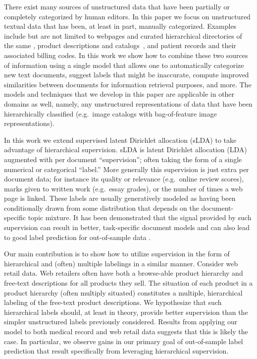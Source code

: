 There exist many sources of unstructured data that have been partially or
completely categorized by human editors.  In this paper we focus on
unstructured textual data that has been, at least in part, manually
categorized.  Examples include but are not limited to webpages and curated
hierarchical directories of the same \citep{DMOZ}, product descriptions and
catalogs~\citep{SNAP}, and patient records and their associated billing codes.
In this work we show how to combine these two sources of information using a
single model that allows one to automatically categorize new text documents,
suggest labels that might be inaccurate, compute improved similarities between
documents for information retrieval purposes, and more. The models and
techniques that we develop in this paper are applicable in other domains as
well, namely, any unstructured representations of data that have been
hierarchically classified (e.g.~image catalogs with bag-of-feature image
representations).   

In this work we extend supervised latent Dirichlet allocation (sLDA) \cite{BleiMcAuliffe2008} to take advantage of hierarchical supervision.  sLDA is latent Dirichlet allocation (LDA) \cite{Blei2003} augmented with per document ``supervision'';  often taking the form of a single numerical or categorical ``label.''  More generally this supervision is just extra per document data;  for instance its quality or relevance (e.g.~online review scores), marks given to written work (e.g.~essay grades), or the number of times a web page is linked.  These labels are usually generatively modeled as having been conditionally drawn from some distribution that depends on the document-specific topic mixture.  It has been demonstrated that the signal provided by such supervision can result in better, task-specific document models and can also lead to good label prediction for out-of-sample data \cite{BleiMcAuliffe2008}.

Our main contribution is to show how to utilize supervision in the form of  hierarchical and (often) multiple labelings in a similar manner.   Consider web retail data.  Web retailers often have both a browse-able product hierarchy and free-text descriptions for all products they sell.   The situation of each product in a product hierarchy (often multiply situated) constitutes a multiple, hierarchical labeling of the free-text product descriptions.  We hypothesize that such hierarchical labels should, at least in theory, provide better supervision than the simpler unstructured labels previously considered.  Results from applying our model to both medical record and web retail data suggests that this is likely the case.  In particular, we observe gains in our primary goal of out-of-sample label prediction that result specifically from leveraging hierarchical supervision. 

